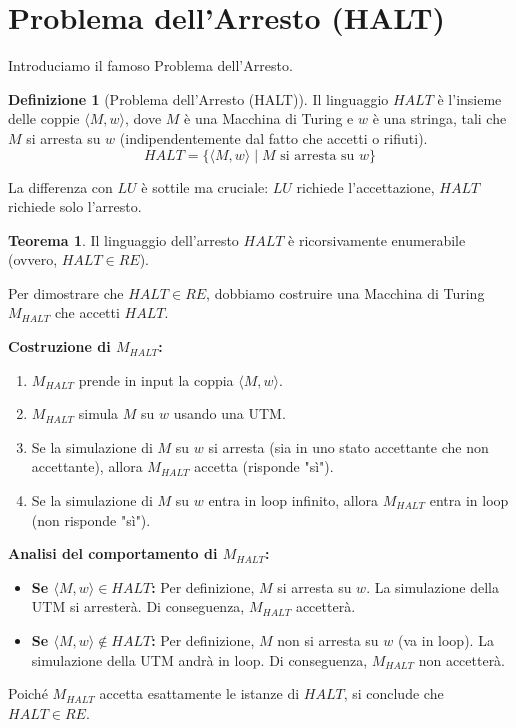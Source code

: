 \documentclass[a4paper]{article}
\makeatletter
\theoremstyle{definition} %
\newtheorem{theorem}{Teorema}
[section] %
\newtheorem{definition}{Definizione}[section] %
\renewenvironment{proof}[1][\proofname]{\par
  \pushQED{\qed}%
  \normalfont \topsep6\p@\@plus6\p@\relax
  \trivlist
  \item[\hskip\labelsep
        \bfseries
    #1\@addpunct{.}]\ignorespaces
}{%
  \popQED\endtrivlist\@endpefalse
}
\makeatother
\begin{document}
\section{Problema dell'Arresto (HALT)}
Introduciamo il famoso Problema dell'Arresto.
\begin{definition}[Problema dell'Arresto (HALT)]
Il linguaggio $HALT$ è l'insieme delle coppie $\langle M, w \rangle$, dove $M$ è una Macchina di Turing e $w$ è una stringa, tali che $M$ si arresta su $w$ (indipendentemente dal fatto che accetti o rifiuti).
\[ HALT = \{ \langle M, w \rangle \mid M \text{ si arresta su } w \} \]
\end{definition}
La differenza con $LU$ è sottile ma cruciale: $LU$ richiede l'accettazione, $HALT$ richiede solo l'arresto.

\begin{theorem}
Il linguaggio dell'arresto $HALT$ è ricorsivamente enumerabile (ovvero, $HALT \in RE$).
\end{theorem}
\begin{proof}
Per dimostrare che $HALT \in RE$, dobbiamo costruire una Macchina di Turing $M_{HALT}$ che accetti $HALT$.

\textbf{Costruzione di $M_{HALT}$:}
\begin{enumerate}
    \item $M_{HALT}$ prende in input la coppia $\langle M, w \rangle$.
    \item $M_{HALT}$ simula $M$ su $w$ usando una UTM.
    \item Se la simulazione di $M$ su $w$ si arresta (sia in uno stato accettante che non accettante), allora $M_{HALT}$ accetta (risponde "sì").
    \item Se la simulazione di $M$ su $w$ entra in loop infinito, allora $M_{HALT}$ entra in loop (non risponde "sì").
\end{enumerate}
\textbf{Analisi del comportamento di $M_{HALT}$:}
\begin{itemize}
    \item \textbf{Se $\langle M, w \rangle \in HALT$:}
    Per definizione, $M$ si arresta su $w$. La simulazione della UTM si arresterà. Di conseguenza, $M_{HALT}$ accetterà.
    \item \textbf{Se $\langle M, w \rangle \notin HALT$:}
    Per definizione, $M$ non si arresta su $w$ (va in loop). La simulazione della UTM andrà in loop. Di conseguenza, $M_{HALT}$ non accetterà.
\end{itemize}
Poiché $M_{HALT}$ accetta esattamente le istanze di $HALT$, si conclude che $HALT \in RE$.
\end{proof}
\end{document}

